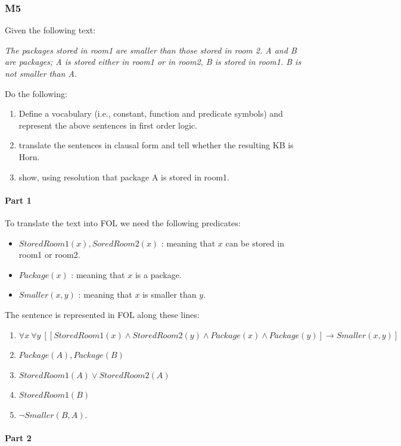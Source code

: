 \documentclass[10pt,a4paper]{article}
\begin{document}
\subsubsection{M5}
Given the following text:
\begin{center}
\textit{The packages stored in room1 are smaller than those stored in room 2.
A and B are packages; A is stored either in room1 or in room2, B is stored in room1. B is not smaller than A.}
\end{center}

Do the following:
\begin{enumerate}
\item Define a vocabulary (i.e., constant, function and predicate symbols) and represent the above sentences in first order logic.
\item translate the sentences in clausal form and tell whether the resulting KB is Horn.
\item show, using resolution that package A is stored in room1.
\end{enumerate}

\paragraph{Part 1}

To translate the text into FOL we need the following predicates:

\begin{itemize}
\item $StoredRoom1(x),SoredRoom2(x)$ : meaning that $x$ can be stored in room1 or room2.
\item $Package(x)$ : meaning that $x$ is a package.
\item $Smaller(x,y)$ : meaning that $x$ is smaller than $y$.
\end{itemize}

The sentence is represented in FOL along these lines:
\begin{enumerate}
\item $\forall x\ \forall y\ [[StoredRoom1(x) \wedge StoredRoom2(y) \wedge Package(x) \wedge Package(y)]\rightarrow Smaller(x,y)]$
\item $Package(A), Package(B)$
\item $StoredRoom1(A) \vee StoredRoom2(A)$
\item $StoredRoom1(B)$
\item $\neg Smaller(B,A)$.
\end{enumerate}

\paragraph{Part 2}
\end{document}
